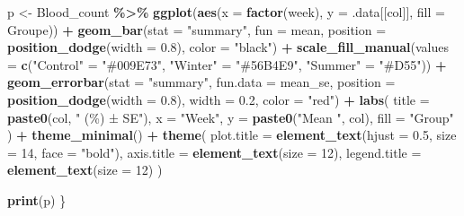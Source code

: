 \documentclass[
]{article}
\newenvironment{Shaded}{\begin{snugshade}}{\end{snugshade}}
\newcommand{\AttributeTok}[1]{\textcolor[rgb]{0.13,0.29,0.53}{#1}}
\newcommand{\DecValTok}[1]{\textcolor[rgb]{0.00,0.00,0.81}{#1}}
\newcommand{\FloatTok}[1]{\textcolor[rgb]{0.00,0.00,0.81}{#1}}
\newcommand{\FunctionTok}[1]{\textcolor[rgb]{0.13,0.29,0.53}{\textbf{#1}}}
\newcommand{\NormalTok}[1]{#1}
\newcommand{\OtherTok}[1]{\textcolor[rgb]{0.56,0.35,0.01}{#1}}
\newcommand{\SpecialCharTok}[1]{\textcolor[rgb]{0.81,0.36,0.00}{\textbf{#1}}}
\newcommand{\StringTok}[1]{\textcolor[rgb]{0.31,0.60,0.02}{#1}}
\begin{document}
\begin{Shaded}
\begin{Highlighting}[]
\NormalTok{  p }\OtherTok{\textless{}{-}}\NormalTok{ Blood\_count }\SpecialCharTok{\%\textgreater{}\%}
    \FunctionTok{ggplot}\NormalTok{(}\FunctionTok{aes}\NormalTok{(}\AttributeTok{x =} \FunctionTok{factor}\NormalTok{(week), }\AttributeTok{y =}\NormalTok{ .data[[col]], }\AttributeTok{fill =}\NormalTok{ Groupe)) }\SpecialCharTok{+}
    \FunctionTok{geom\_bar}\NormalTok{(}\AttributeTok{stat =} \StringTok{"summary"}\NormalTok{, }\AttributeTok{fun =}\NormalTok{ mean, }
             \AttributeTok{position =} \FunctionTok{position\_dodge}\NormalTok{(}\AttributeTok{width =} \FloatTok{0.8}\NormalTok{), }\AttributeTok{color =} \StringTok{"black"}\NormalTok{) }\SpecialCharTok{+}
     \FunctionTok{scale\_fill\_manual}\NormalTok{(}\AttributeTok{values =} \FunctionTok{c}\NormalTok{(}\StringTok{"Control"} \OtherTok{=} \StringTok{"\#009E73"}\NormalTok{, }\StringTok{"Winter"} \OtherTok{=} \StringTok{"\#56B4E9"}\NormalTok{, }\StringTok{"Summer"} \OtherTok{=} \StringTok{"\#D55"}\NormalTok{)) }\SpecialCharTok{+}
    \FunctionTok{geom\_errorbar}\NormalTok{(}\AttributeTok{stat =} \StringTok{"summary"}\NormalTok{, }\AttributeTok{fun.data =}\NormalTok{ mean\_se, }
                  \AttributeTok{position =} \FunctionTok{position\_dodge}\NormalTok{(}\AttributeTok{width =} \FloatTok{0.8}\NormalTok{), }\AttributeTok{width =} \FloatTok{0.2}\NormalTok{, }\AttributeTok{color =} \StringTok{"red"}\NormalTok{) }\SpecialCharTok{+}
    \FunctionTok{labs}\NormalTok{(}
      \AttributeTok{title =} \FunctionTok{paste0}\NormalTok{(col, }\StringTok{" (\%) ± SE"}\NormalTok{),}
      \AttributeTok{x =} \StringTok{"Week"}\NormalTok{,}
      \AttributeTok{y =} \FunctionTok{paste0}\NormalTok{(}\StringTok{"Mean "}\NormalTok{, col),}
      \AttributeTok{fill =} \StringTok{"Group"}
\NormalTok{    ) }\SpecialCharTok{+}
    \FunctionTok{theme\_minimal}\NormalTok{() }\SpecialCharTok{+}
    \FunctionTok{theme}\NormalTok{(}
      \AttributeTok{plot.title =} \FunctionTok{element\_text}\NormalTok{(}\AttributeTok{hjust =} \FloatTok{0.5}\NormalTok{, }\AttributeTok{size =} \DecValTok{14}\NormalTok{, }\AttributeTok{face =} \StringTok{"bold"}\NormalTok{),}
      \AttributeTok{axis.title =} \FunctionTok{element\_text}\NormalTok{(}\AttributeTok{size =} \DecValTok{12}\NormalTok{),}
      \AttributeTok{legend.title =} \FunctionTok{element\_text}\NormalTok{(}\AttributeTok{size =} \DecValTok{12}\NormalTok{)}
\NormalTok{    )}
  
  \FunctionTok{print}\NormalTok{(p)}
\NormalTok{\}}
\end{Highlighting}
\end{Shaded}
\end{document}
